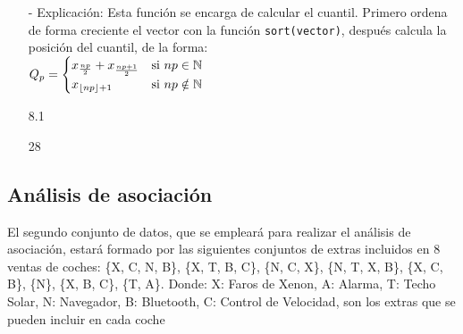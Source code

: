 \documentclass[a4paper, 12pt]{article}
\begin{document}
\begin{itemize}
\begin{itemize}
			\item[-] Explicación: Esta función se encarga de calcular el cuantil. Primero ordena de forma creciente el vector con la función \texttt{sort(vector)}, después calcula la posición del cuantil, de la forma: \\
			$\text{\texttt{{$Q_{p}$}}} = \begin{cases} 
				x_{\frac{np}{2}}+x_{\frac{np+1}{2}} & \text{si } np \in \mathbb{N} \\
				x_{\lfloor{np}\rfloor +1} & \text{si } np \notin \mathbb{N}
			\end{cases}$
\begin{Schunk}
\begin{Soutput}
[1] 8.1
\end{Soutput}
\begin{Soutput}
[1] 28
\end{Soutput}
\end{Schunk}
		\end{itemize}
	\end{itemize}
	
	\subsection{Análisis de asociación}
	El segundo conjunto de datos, que se empleará para realizar el análisis de asociación, estará formado por las siguientes conjuntos de extras incluidos en 8 ventas de coches: \{X, C, N, B\}, \{X, T, B, C\}, \{N, C, X\}, \{N, T, X, B\}, \{X, C, B\}, \{N\}, \{X, B, C\}, \{T, A\}. Donde: {X: Faros de Xenon, A: Alarma, T: Techo Solar, N: Navegador, B: Bluetooth, C: Control de Velocidad}, son los extras que se pueden incluir en cada coche
		
\end{document}
